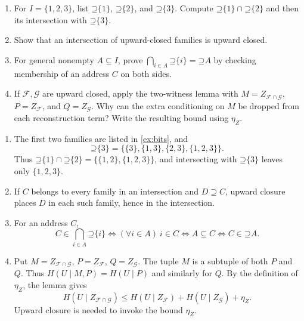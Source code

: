 \documentclass[11pt]{article}
\newcommand{\Up}{\mathord{\supseteq}}
\begin{document}
\begin{exercise}
\label{ex:intersections}\important
\begin{enumerate}
\item For $I=\{1,2,3\}$, list $\Up\{1\}$, $\Up\{2\}$, and
$\Up\{3\}$. Compute $\Up\{1\}\cap\Up\{2\}$ and then its
intersection with $\Up\{3\}$.
\item Show that an intersection of upward-closed families is upward closed.
\item For general nonempty $A\subseteq I$, prove
$\bigcap_{i\in A}\Up\{i\}=\Up A$ by checking membership of an address
$C$ on both sides.
\item If $\mathcal{F},\mathcal{G}$ are upward closed, apply the two-witness
lemma with $M=Z_{\mathcal{F}\cap\mathcal{G}}$,
$P=Z_{\mathcal{F}}$, and $Q=Z_{\mathcal{G}}$.
Why can the extra conditioning on $M$ be dropped from each reconstruction
term? Write the resulting bound using $\eta_Z$.
\end{enumerate}
\end{exercise}
\begin{solution}[ex:intersections]
\begin{enumerate}
\item The first two families are listed in \cref{ex:bits}, and
\[
 \Up\{3\}=\{\{3\},\{1,3\},\{2,3\},\{1,2,3\}\}.
\]
Thus $\Up\{1\}\cap\Up\{2\}=\{\{1,2\},\{1,2,3\}\}$,
and intersecting with $\Up\{3\}$ leaves only $\{1,2,3\}$.
\item If $C$ belongs to every family in an intersection and $D\supseteq C$,
upward closure places $D$ in each such family, hence in the intersection.
\item For an address $C$,
\[
 C\in\bigcap_{i\in A}\Up\{i\}
 \iff
 (\forall i\in A)\ i\in C
 \iff A\subseteq C
 \iff C\in\Up A.
\]
\item Put $M=Z_{\mathcal{F}\cap\mathcal{G}}$,
$P=Z_{\mathcal{F}}$, $Q=Z_{\mathcal{G}}$. The tuple $M$ is a subtuple of
both $P$ and $Q$. Thus $H(U\mid M,P)=H(U\mid P)$ and similarly for $Q$.
By the definition of $\eta_Z$, the lemma gives
\[
 H(U\mid Z_{\mathcal{F}\cap\mathcal{G}})
 \le H(U\mid Z_{\mathcal{F}})+H(U\mid Z_{\mathcal{G}})+\eta_Z.
\]
Upward closure is needed to invoke the bound $\eta_Z$.
\end{enumerate}
\end{solution}
\end{document}
